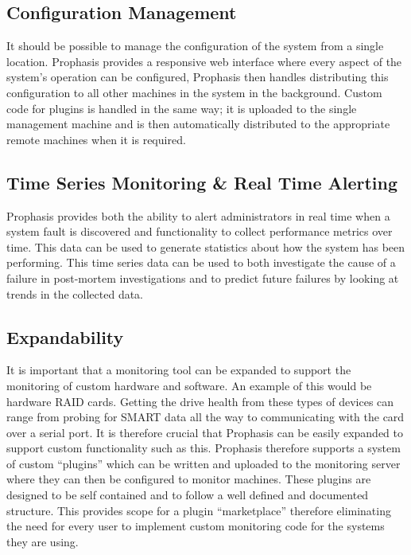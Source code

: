 \documentclass[bsc,logo,twoside,parskip,singlespacing,notimes]{infthesis}
\begin{document}
\subsection{Configuration Management}

	It should be possible to manage the configuration of the system from a single
	location.  Prophasis provides a responsive web interface where every
	aspect of the system's operation can be configured, Prophasis then handles
	distributing this configuration to all other machines in the system in the
	background. Custom code for plugins is handled in the same way; it is uploaded
	to the single management machine and is then automatically distributed to the
	appropriate remote machines when it is required.

\subsection{Time Series Monitoring \& Real Time Alerting}

	Prophasis provides both the ability to alert administrators in real time when a
	system fault is discovered and functionality to collect
	performance metrics over time. This data can be used to generate statistics about
	how the system has been performing.  This time series data can be used to both
	investigate the cause of a failure in post-mortem investigations and to predict
	future failures by looking at trends in the	collected data.

\subsection{Expandability}

	It is important that a monitoring tool can be expanded to support the
	monitoring of custom hardware and software.  An example of this would be
	hardware RAID cards.  Getting the drive health from these types of devices can
	range from probing for SMART data all the way to communicating with the card
	over a serial port.  It is therefore crucial that Prophasis can be easily
	expanded to support custom functionality such as this. Prophasis therefore
	supports a system of custom ``plugins'' which can be written and uploaded to the
	monitoring server where they can then be configured to monitor machines. These
	plugins are designed to be self contained and to follow a well defined and
	documented structure.  This provides scope for a plugin ``marketplace'' therefore
	eliminating the need for every user to implement custom monitoring code for the
	systems they are using.
\end{document}
